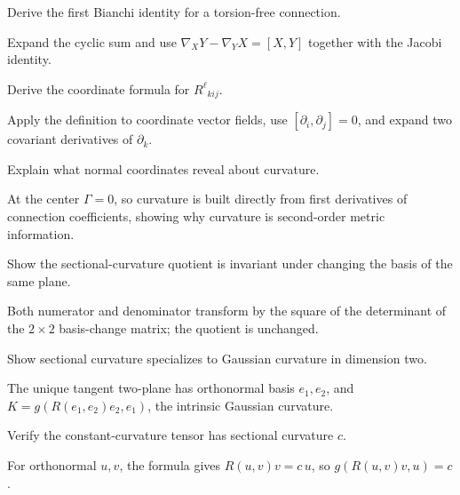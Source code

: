 \begin{problem}\label{prob:vii26-02}
Derive the first Bianchi identity for a torsion-free connection.
\end{problem}
\begin{solution}
Expand the cyclic sum and use \(\nabla_XY-\nabla_YX=[X,Y]\) together with the Jacobi identity.
\end{solution}

\begin{problem}\label{prob:vii26-03}
Derive the coordinate formula for \(R^\ell{}_{kij}\).
\end{problem}
\begin{solution}
Apply the definition to coordinate vector fields, use \([\partial_i,\partial_j]=0\), and expand two covariant derivatives of \(\partial_k\).
\end{solution}

\begin{problem}\label{prob:vii26-04}
Explain what normal coordinates reveal about curvature.
\end{problem}
\begin{solution}
At the center \(\Gamma=0\), so curvature is built directly from first derivatives of connection coefficients, showing why curvature is second-order metric information.
\end{solution}

\begin{problem}\label{prob:vii26-05}
Show the sectional-curvature quotient is invariant under changing the basis of the same plane.
\end{problem}
\begin{solution}
Both numerator and denominator transform by the square of the determinant of the \(2\times2\) basis-change matrix; the quotient is unchanged.
\end{solution}

\begin{problem}\label{prob:vii26-06}
Show sectional curvature specializes to Gaussian curvature in dimension two.
\end{problem}
\begin{solution}
The unique tangent two-plane has orthonormal basis \(e_1,e_2\), and \(K=g(R(e_1,e_2)e_2,e_1)\), the intrinsic Gaussian curvature.
\end{solution}

\begin{problem}\label{prob:vii26-07}
Verify the constant-curvature tensor has sectional curvature \(c\).
\end{problem}
\begin{solution}
For orthonormal \(u,v\), the formula gives \(R(u,v)v=c\,u\), so \(g(R(u,v)v,u)=c\).
\end{solution}

